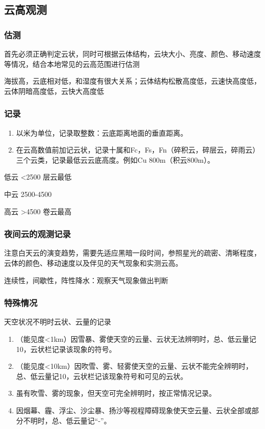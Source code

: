 ﻿\documentclass[UTF8,11pt]{ctexbook}%
\begin{document}
\subsection{云高观测}

\subsubsection{估测}

首先必须正确判定云状，同时可根据云体结构，云块大小、亮度、颜色、移动速度等情况，结合本地常见的云高范围进行估测

海拔高，云底相对低，和湿度有很大关系；云体结构松散高度低，云速快高度低，云体阴暗高度低，云快大高度低

\subsubsection{记录}

\begin{enumerate}
	\item 以米为单位，记录取整数：云底距离地面的垂直距离。
	\item 在云高数值前加记云状，记录十属和Fc，Fs，Fn（碎积云，碎层云，碎雨云）三个云类，记录最低云云底高度。例如Cu 800m（积云800m）。
\end{enumerate}

低云	<2500		层云最低

中云	2500-4500	

高云	>4500		卷云最高

\subsubsection{夜间云的观测记录}

	注意白天云的演变趋势，需要先适应黑暗一段时间，参照星光的疏密、清晰程度，云体的颜色、移动速度以及伴见的天气现象和实测云高。

	连续性，间歇性，阵性降水：观察天气现象做出判断

\subsubsection{特殊情况}

	天空状况不明时云状、云量的记录

\begin{enumerate}
	\item （能见度<1km）因雪暴、雾使天空的云量、云状无法辨明时，总、低云量记10，云状栏记录该现象的符号。
	\item （能见度<10km）因吹雪、雾、轻雾使天空的云量、云状不能完全辨明时，总、低云量记10，云状栏记该现象符号和可见的云状。
	\item 虽有吹雪、雾的现象，但天空可完全辨明时，按正常情况记录。
	\item 因烟幕、霾、浮尘、沙尘暴、扬沙等视程障碍现象使天空云量、云状全部或部分不明时，总、低云量记“-”。
\end{enumerate}
\end{document}
